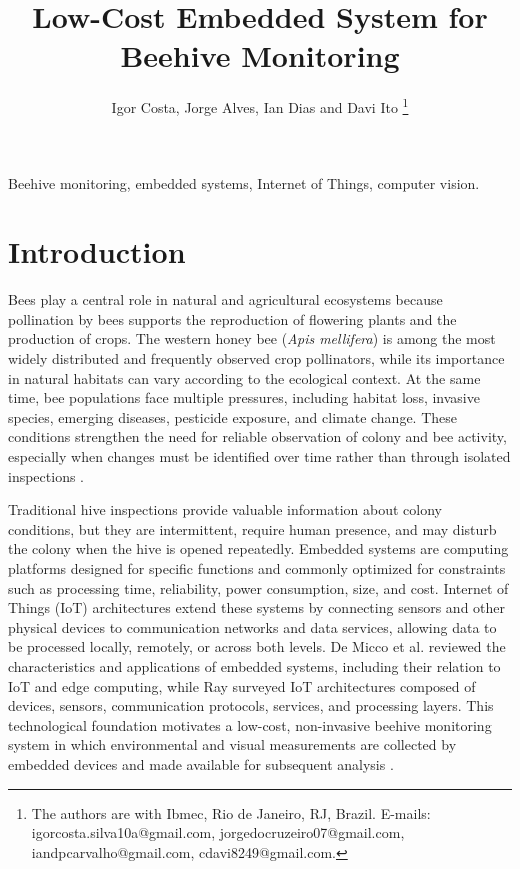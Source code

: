 \documentclass[english,hidelinks]{sbrt}
\begin{document}
\title{Low-Cost Embedded System for Beehive Monitoring}

\author{Igor Costa, Jorge Alves, Ian Dias and Davi Ito
  \thanks{The authors are with Ibmec, Rio de Janeiro, RJ, Brazil.
  E-mails: igorcosta.silva10a@gmail.com,
  jorgedocruzeiro07@gmail.com,
  iandpcarvalho@gmail.com,
  cdavi8249@gmail.com.}%
  }

\maketitle


\begin{abstract}
\end{abstract}
\begin{keywords}
Beehive monitoring, embedded systems, Internet of Things, computer vision.
\end{keywords}

\section{Introduction}

Bees play a central role in natural and agricultural ecosystems because pollination by bees supports the reproduction of flowering plants and the production of crops. The western honey bee (\textit{Apis mellifera}) is among the most widely distributed and frequently observed crop pollinators, while its importance in natural habitats can vary according to the ecological context. At the same time, bee populations face multiple pressures, including habitat loss, invasive species, emerging diseases, pesticide exposure, and climate change. These conditions strengthen the need for reliable observation of colony and bee activity, especially when changes must be identified over time rather than through isolated inspections \cite{hung2018pollinators,brown2009conservation}.

Traditional hive inspections provide valuable information about colony conditions, but they are intermittent, require human presence, and may disturb the colony when the hive is opened repeatedly. Embedded systems are computing platforms designed for specific functions and commonly optimized for constraints such as processing time, reliability, power consumption, size, and cost. Internet of Things (IoT) architectures extend these systems by connecting sensors and other physical devices to communication networks and data services, allowing data to be processed locally, remotely, or across both levels. De Micco et al. reviewed the characteristics and applications of embedded systems, including their relation to IoT and edge computing, while Ray surveyed IoT architectures composed of devices, sensors, communication protocols, services, and processing layers. This technological foundation motivates a low-cost, non-invasive beehive monitoring system in which environmental and visual measurements are collected by embedded devices and made available for subsequent analysis \cite{demicco2020embedded,ray2018iotarchitectures}.
\end{document}
